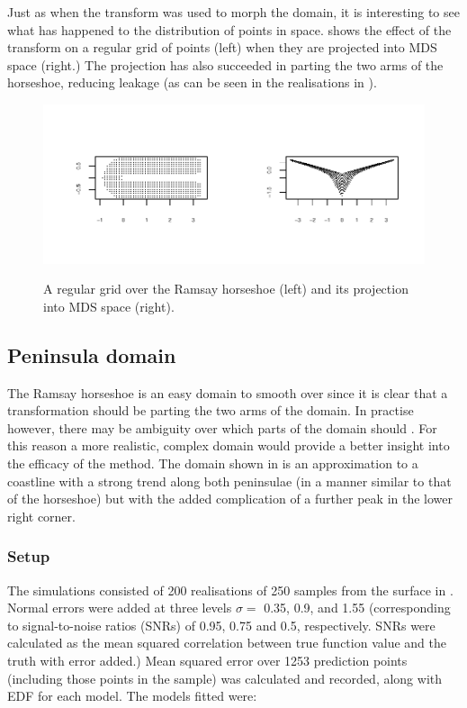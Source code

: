 Just as when the \sch transform was used to morph the domain, it is interesting to see what has happened to the distribution of points in space.  shows the effect of the transform on a regular grid of points (left) when they are projected into MDS space (right.) The projection has also succeeded in parting the two arms of the horseshoe, reducing leakage (as can be seen in the realisations in ).

\begin{figure}
\centering
\includegraphics[width=6in,trim=0.5in 0.5in 0in 0.5in]{mds/figs/mdsrampoints.pdf} \\
\caption{A regular grid over the Ramsay horseshoe (left) and its projection into MDS space (right).}
\label{mdsrampoints}
\end{figure}


\subsection{Peninsula domain}
\label{mds-wt2-sim}

The Ramsay horseshoe is an easy domain to smooth over since it is clear that a transformation should be parting the two arms of the domain. In practise however, there may be ambiguity over which parts of the domain should . For this reason a more realistic, complex domain would provide a better insight into the efficacy of the method. The domain shown in  is an approximation to a coastline with a strong trend along both peninsulae (in a manner similar to that of the horseshoe) but with the added complication of a further peak in the lower right corner.

\subsubsection{Setup}

The simulations consisted of 200 realisations of 250 samples from the surface in . Normal errors were added at three levels $\sigma=$ 0.35, 0.9, and 1.55 (corresponding to signal-to-noise ratios (SNRs) of 0.95, 0.75 and 0.5, respectively. SNRs were calculated as the mean squared correlation between true function value and the truth with error added.) Mean squared error over 1253 prediction points (including those points in the sample) was calculated and recorded, along with EDF for each model. The models fitted were:

